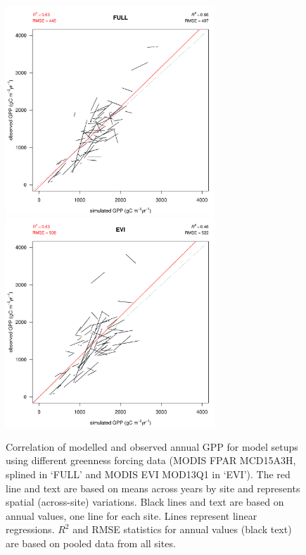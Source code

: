 \documentclass{myreport}
\begin{document}
\begin{figure}[!ht]
    \centering
    \includegraphics[width=0.7\textwidth]{fig/modobs_spatial_annual_FULL.pdf}
    \includegraphics[width=0.7\textwidth]{fig/modobs_spatial_annual_EVI.pdf}
    \caption{Correlation of modelled and observed annual GPP for model setups using different greenness forcing data (MODIS FPAR MCD15A3H, splined in `FULL' and MODIS EVI MOD13Q1 in `EVI'). The red line and text are based on means across years by site and represents spatial (across-site) variations. Black lines and text are based on annual values, one line for each site. Lines represent linear regressions. $R^2$ and RMSE statistics for annual values (black text) are based on pooled data from all sites.}
    \label{fig:modobs_spatialannual_greenness}
\end{figure}
\end{document}
